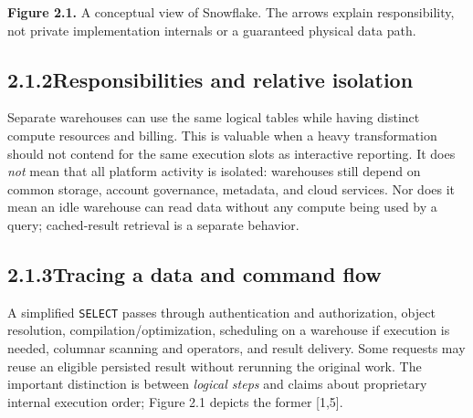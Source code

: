 \documentclass[11pt,twoside]{article}
\newcommand{\topic}[2]{\subsection*{#1\quad #2}}
\begin{document}
\begin{center}
\end{center}
{\small\color{inkgray}\textbf{Figure 2.1.} A conceptual view of Snowflake. The arrows explain responsibility, not private implementation internals or a guaranteed physical data path.}\par

\topic{2.1.2}{Responsibilities and relative isolation}
Separate warehouses can use the same logical tables while having distinct compute resources and billing. This is valuable when a heavy transformation should not contend for the same execution slots as interactive reporting. It does \emph{not} mean that all platform activity is isolated: warehouses still depend on common storage, account governance, metadata, and cloud services. Nor does it mean an idle warehouse can read data without any compute being used by a query; cached-result retrieval is a separate behavior.

\topic{2.1.3}{Tracing a data and command flow}
A simplified \texttt{SELECT} passes through authentication and authorization, object resolution, compilation/optimization, scheduling on a warehouse if execution is needed, columnar scanning and operators, and result delivery. Some requests may reuse an eligible persisted result without rerunning the original work. The important distinction is between \emph{logical steps} and claims about proprietary internal execution order; Figure 2.1 depicts the former [1,5].
\end{document}
